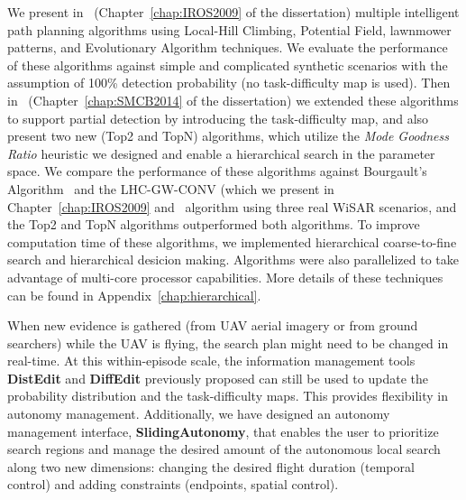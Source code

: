 We present in~\cite{Lin2009UAV} (Chapter~\ref{chap:IROS2009} of the dissertation) multiple intelligent path planning algorithms using Local-Hill Climbing, Potential Field, lawnmower patterns, and Evolutionary Algorithm techniques. We evaluate the performance of these algorithms against simple and complicated synthetic scenarios with the assumption of 100\% detection probability (no task-difficulty map is used). Then in~\cite{Lin2014Hierarchical} (Chapter~\ref{chap:SMCB2014} of the dissertation) we extended these algorithms to support partial detection by introducing the task-difficulty map, and also present two new (Top2 and TopN) algorithms, which utilize the \textit{Mode Goodness Ratio} heuristic we designed and enable a hierarchical search in the parameter space. We compare the performance of these algorithms against Bourgault's Algorithm~\cite{Bourgault2006Optimal} and the LHC-GW-CONV (which we present in Chapter~\ref{chap:IROS2009} and~\cite{Lin2009UAV} algorithm using three real WiSAR scenarios, and the Top2 and TopN algorithms outperformed both algorithms. To improve computation time of these algorithms, we implemented hierarchical coarse-to-fine search and hierarchical desicion making. Algorithms were also parallelized to take advantage of multi-core processor capabilities. More details of these techniques can be found in Appendix~\ref{chap:hierarchical}.

When new evidence is gathered (from UAV aerial imagery or from ground searchers) while the UAV is flying, the search plan might need to be changed in real-time. At this within-episode scale, the information management tools \textbf{DistEdit} and \textbf{DiffEdit} previously proposed can still be used to update the probability distribution and the task-difficulty maps. This provides flexibility in autonomy management. Additionally, we have designed an autonomy management interface, \textbf{SlidingAutonomy}, that enables the user to prioritize search regions and manage the desired amount of the autonomous local search along two new dimensions: changing the desired flight duration (temporal control) and adding constraints (endpoints, spatial control).

